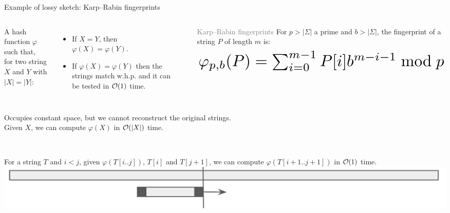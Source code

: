 \begin{frame}{Example of lossy sketch: Karp--Rabin fingerprints}
    \pause
    \begin{columns}
        A hash function $\varphi$ such that,\\ 
        for two string $X$ and $Y$ with $|X|=|Y|$: 
        \begin{itemize}
            \item If $X=Y$, then $\varphi(X)=\varphi(Y)$. 
            \item If $\varphi(X)=\varphi(Y)$ then the strings match w.h.p. and it can be tested in $\mathcal{O}(1)$ time.
        \end{itemize} 

        \vspace{-1cm}
        \begin{mydefblock}{\footnotesize \textcolor{gray}{Karp--Rabin fingerprints}}
            \scriptsize
            For $p>|\Sigma|$ a prime and $b > |\Sigma|$,
            the fingerprint of a string $P$ of length $m$ is:
            \begin{equation*}
                \resizebox{\hsize}{!}{$\varphi_{p,b}(P) = \mathop{\sum}_{i = 0}^{m-1}  P[i]b^{m-i-1} \bmod p$}
            \end{equation*}
            \vspace{-0.5cm}
        \end{mydefblock}
    \end{columns}\pause

    Occupies constant space, but we cannot reconstruct the original strings.\\ \pause
    \smallskip
    Given $X$, we can compute $\varphi(X)$ in $\mathcal{O}(|X|)$ time.\\ \pause
    \medskip

    \begin{columns}
        \\ 
        For a string $T$ and $i<j$, given $\varphi(T[i..j])$, $T[i]$ and $T[j+1]$,
        we can compute $\varphi(T[i+1..j+1])$ in $\mathcal{O}(1)$ time.
        \includegraphics[width=\textwidth]{pictures/slidding_window.png}
    \end{columns}
\end{frame}

